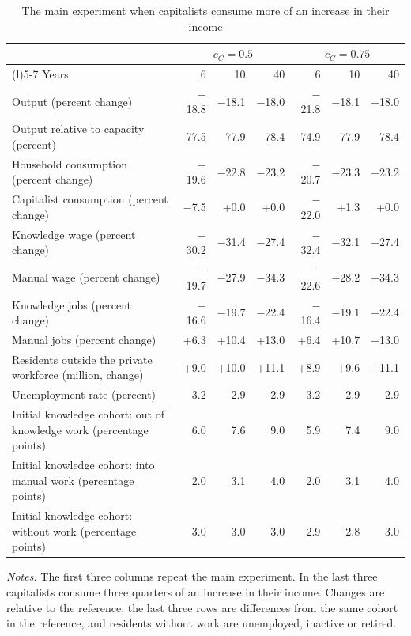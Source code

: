 \begin{table}[htbp]\centering\small
\caption{The main experiment when capitalists consume more of an increase in their income}\label{tab:spending}
\begin{tabularx}{\linewidth}{@{}>{\raggedright\arraybackslash}Xrrrrrr@{}}\toprule
 & \multicolumn{3}{c}{$c_C=0.5$} & \multicolumn{3}{c}{$c_C=0.75$} \\\cmidrule(lr){2-4}\cmidrule(l){5-7}
Years & 6 & 10 & 40 & 6 & 10 & 40 \\
\midrule Output (percent change) & $-$18.8 & $-$18.1 & $-$18.0 & $-$21.8 & $-$18.1 & $-$18.0 \\
Output relative to capacity (percent) & 77.5 & 77.9 & 78.4 & 74.9 & 77.9 & 78.4 \\
Household consumption (percent change) & $-$19.6 & $-$22.8 & $-$23.2 & $-$20.7 & $-$23.3 & $-$23.2 \\
Capitalist consumption (percent change) & $-$7.5 & +0.0 & +0.0 & $-$22.0 & +1.3 & +0.0 \\
Knowledge wage (percent change) & $-$30.2 & $-$31.4 & $-$27.4 & $-$32.4 & $-$32.1 & $-$27.4 \\
Manual wage (percent change) & $-$19.7 & $-$27.9 & $-$34.3 & $-$22.6 & $-$28.2 & $-$34.3 \\
Knowledge jobs (percent change) & $-$16.6 & $-$19.7 & $-$22.4 & $-$16.4 & $-$19.1 & $-$22.4 \\
Manual jobs (percent change) & +6.3 & +10.4 & +13.0 & +6.4 & +10.7 & +13.0 \\
Residents outside the private workforce (million, change) & +9.0 & +10.0 & +11.1 & +8.9 & +9.6 & +11.1 \\
Unemployment rate (percent) & 3.2 & 2.9 & 2.9 & 3.2 & 2.9 & 2.9 \\
Initial knowledge cohort: out of knowledge work (percentage points) & 6.0 & 7.6 & 9.0 & 5.9 & 7.4 & 9.0 \\
Initial knowledge cohort: into manual work (percentage points) & 2.0 & 3.1 & 4.0 & 2.0 & 3.1 & 4.0 \\
Initial knowledge cohort: without work (percentage points) & 3.0 & 3.0 & 3.0 & 2.9 & 2.8 & 3.0 \\
\bottomrule\end{tabularx}
\par\smallskip\begin{minipage}{\linewidth}\footnotesize\emph{Notes.} The first three columns repeat the main experiment. In the last three capitalists consume three quarters of an increase in their income. Changes are relative to the reference; the last three rows are differences from the same cohort in the reference, and residents without work are unemployed, inactive or retired.\end{minipage}
\end{table}
